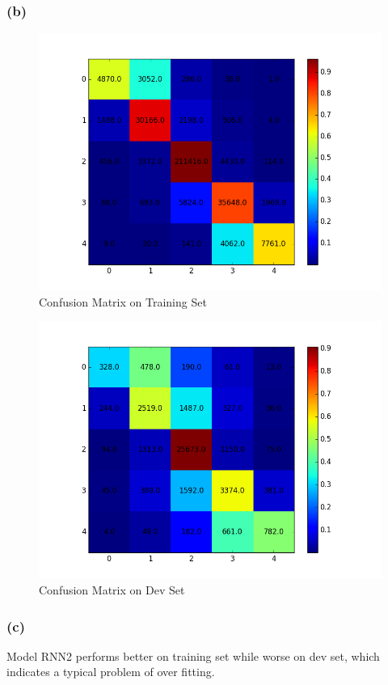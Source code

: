 \documentclass {article}
\begin{document}
\subsubsection*{(b)}
\begin{figure}[H]
\centering
\includegraphics[width=0.7\linewidth]{ps3_2_c_b_train}
\caption{Confusion Matrix on Training Set}
\label{fig:ps3_2_c_b_train}
\end{figure}
\begin{figure}[H]
\centering
\includegraphics[width=0.7\linewidth]{ps3_2_c_b_dev}
\caption{Confusion Matrix on Dev Set}
\label{fig:ps3_2_c_b_dev}
\end{figure}

\subsubsection*{(c)}
Model RNN2 performs better on training set while worse on dev set, which indicates a typical problem of over fitting.
\end{document}
